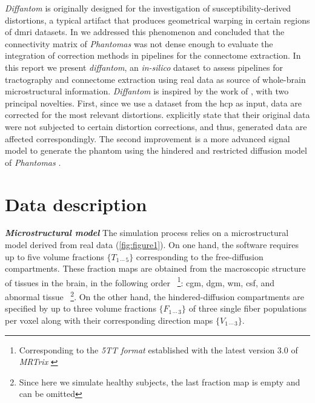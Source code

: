 \documentclass[english]{frontiers/frontiersSCNS} %
\begin{document}
\emph{Diffantom} is originally designed for the investigation of susceptibility-derived distortions, a
  typical artifact that produces geometrical warping in certain regions of \gls*{dmri} datasets.
In \citep{esteban_simulationbased_2014} we addressed this phenomenon and concluded that the connectivity
  matrix of \emph{Phantomas} was not dense enough to evaluate the integration of correction methods
  in pipelines for the connectome extraction.
In this report we present \emph{diffantom}, an \emph{in-silico} dataset to assess pipelines for tractography
  and connectome extraction using real data as source of whole-brain microstructural information.
\emph{Diffantom} is inspired by the work of \cite{wilkins_fiber_2014}, with two principal novelties.
First, since we use a dataset from the \gls*{hcp} as input, data are corrected for the most relevant distortions.
\cite{wilkins_fiber_2014} explicitly state that their original data were not subjected to certain distortion
  corrections, and thus, generated data are affected correspondingly.
The second improvement is a more advanced signal model to generate the phantom using the hindered and restricted
  diffusion model of \emph{Phantomas} \citep{caruyer_phantomas_2014}.


\section*{Data description}

\noindent\textbf{\textit{Microstructural model\textcolon}\label{sec:data_model}} %
The simulation process relies on a microstructural model derived from real data (\autoref{fig:figure1}).
On one hand, the software requires up to five volume fractions $\{T_{1\,\cdots\,5}\}$ corresponding to the
  free-diffusion compartments.
These fraction maps are obtained from the macroscopic structure of tissues in the brain,
  in the following order~%
\footnote{Corresponding to the \emph{5TT format} established with the latest version 3.0
  of \emph{MRTrix} \citep{tournier_mrtrix_2012}}:
\gls*{cgm}, \gls*{dgm}, \gls*{wm}, \gls*{csf}, and abnormal tissue~%
\footnote{Since here we simulate healthy subjects, the last fraction map is empty and can be omitted}.
On the other hand, the hindered-diffusion compartments are specified by up to three volume fractions $\{F_{1\,\cdots\,3}\}$
  of three single fiber populations per voxel along with their corresponding direction maps $\{V_{1\,\cdots\,3}\}$.
\end{document}
